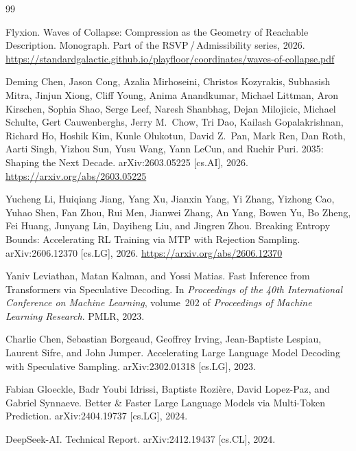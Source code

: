 \documentclass[11pt, a4paper, openany]{book}
\theoremstyle{plain}
\theoremstyle{definition}
\theoremstyle{remark}
\begin{document}
\begin{thebibliography}{99}

Flyxion.
\newblock Waves of Collapse: Compression as the Geometry of Reachable Description.
\newblock Monograph. Part of the RSVP\,/\,Admissibility series, 2026.
\newblock \url{https://standardgalactic.github.io/playfloor/coordinates/waves-of-collapse.pdf}

Deming Chen, Jason Cong, Azalia Mirhoseini, Christos Kozyrakis, Subhasish Mitra,
Jinjun Xiong, Cliff Young, Anima Anandkumar, Michael Littman, Aron Kirschen,
Sophia Shao, Serge Leef, Naresh Shanbhag, Dejan Milojicic, Michael Schulte,
Gert Cauwenberghs, Jerry M.\ Chow, Tri Dao, Kailash Gopalakrishnan, Richard Ho,
Hoshik Kim, Kunle Olukotun, David Z.\ Pan, Mark Ren, Dan Roth, Aarti Singh,
Yizhou Sun, Yusu Wang, Yann LeCun, and Ruchir Puri.
 2035: Shaping the Next Decade.
\newblock arXiv:2603.05225 [cs.AI], 2026.
\newblock \url{https://arxiv.org/abs/2603.05225}

Yucheng Li, Huiqiang Jiang, Yang Xu, Jianxin Yang, Yi Zhang, Yizhong Cao,
Yuhao Shen, Fan Zhou, Rui Men, Jianwei Zhang, An Yang, Bowen Yu, Bo Zheng,
Fei Huang, Junyang Lin, Dayiheng Liu, and Jingren Zhou.
\newblock Breaking Entropy Bounds: Accelerating {RL} Training via {MTP} with
  Rejection Sampling.
\newblock arXiv:2606.12370 [cs.LG], 2026.
\newblock \url{https://arxiv.org/abs/2606.12370}

Yaniv Leviathan, Matan Kalman, and Yossi Matias.
\newblock Fast Inference from Transformers via Speculative Decoding.
\newblock In \textit{Proceedings of the 40th International Conference on
  Machine Learning}, volume~202 of \textit{Proceedings of Machine Learning
  Research}. PMLR, 2023.

Charlie Chen, Sebastian Borgeaud, Geoffrey Irving, Jean-Baptiste Lespiau,
Laurent Sifre, and John Jumper.
\newblock Accelerating Large Language Model Decoding with Speculative Sampling.
\newblock arXiv:2302.01318 [cs.LG], 2023.

Fabian Gloeckle, Badr Youbi Idrissi, Baptiste Rozi\`ere, David Lopez-Paz,
and Gabriel Synnaeve.
\newblock Better \& Faster Large Language Models via Multi-Token Prediction.
\newblock arXiv:2404.19737 [cs.LG], 2024.

DeepSeek-AI.
 Technical Report.
\newblock arXiv:2412.19437 [cs.CL], 2024.


\end{thebibliography}
\end{document}

